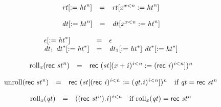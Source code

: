 \vspace{1ex}

$$
\begin{array}{@{}lcl@{}l@{}}
{{\mathit{rt}}}{[{ := }\;{{\mathit{ht}}^{{\mathit{n}}}}]} &=& {{\mathit{rt}}}{[{{\mathit{x}}^{{\mathit{x}}<{\mathit{n}}}} := {{\mathit{ht}}^{{\mathit{n}}}}]} &  \\
\end{array}
$$

$$
\begin{array}{@{}lcl@{}l@{}}
{{\mathit{dt}}}{[{ := }\;{{\mathit{ht}}^{{\mathit{n}}}}]} &=& {{\mathit{dt}}}{[{{\mathit{x}}^{{\mathit{x}}<{\mathit{n}}}} := {{\mathit{ht}}^{{\mathit{n}}}}]} &  \\
\end{array}
$$

$$
\begin{array}{@{}lcl@{}l@{}}
{\epsilon}{[{ := }\;{{\mathit{ht}}^\ast}]} &=& \epsilon &  \\
{{\mathit{dt}}_{{1}}~{{\mathit{dt}}^\ast}}{[{ := }\;{{\mathit{ht}}^\ast}]} &=& {{\mathit{dt}}_{{1}}}{[{ := }\;{{\mathit{ht}}^\ast}]}~{{{\mathit{dt}}^\ast}}{[{ := }\;{{\mathit{ht}}^\ast}]} &  \\
\end{array}
$$

\vspace{1ex}

$$
\begin{array}{@{}lcl@{}l@{}}
{{\mathrm{roll}}}_{{\mathit{x}}}(\mathsf{rec}~{{\mathit{st}}^{{\mathit{n}}}}) &=& \mathsf{rec}~{({{\mathit{st}}}{[{({\mathit{x}} + {\mathit{i}})^{{\mathit{i}}<{\mathit{n}}}} := {(\mathsf{rec}~{\mathit{i}})^{{\mathit{i}}<{\mathit{n}}}}]})^{{\mathit{n}}}} &  \\
\end{array}
$$

$$
\begin{array}{@{}lcl@{}l@{}}
{\mathrm{unroll}}(\mathsf{rec}~{{\mathit{st}}^{{\mathit{n}}}}) &=& \mathsf{rec}~{({{\mathit{st}}}{[{(\mathsf{rec}~{\mathit{i}})^{{\mathit{i}}<{\mathit{n}}}} := {({\mathit{qt}} . {\mathit{i}})^{{\mathit{i}}<{\mathit{n}}}}]})^{{\mathit{n}}}} &\quad
  \mbox{if}~{\mathit{qt}} = \mathsf{rec}~{{\mathit{st}}^{{\mathit{n}}}} \\
\end{array}
$$

$$
\begin{array}{@{}lcl@{}l@{}}
{{\mathrm{roll}}}_{{\mathit{x}}}({\mathit{qt}}) &=& {((\mathsf{rec}~{{\mathit{st}}^{{\mathit{n}}}}) . {\mathit{i}})^{{\mathit{i}}<{\mathit{n}}}} &\quad
  \mbox{if}~{{\mathrm{roll}}}_{{\mathit{x}}}({\mathit{qt}}) = \mathsf{rec}~{{\mathit{st}}^{{\mathit{n}}}} \\
\end{array}
$$

